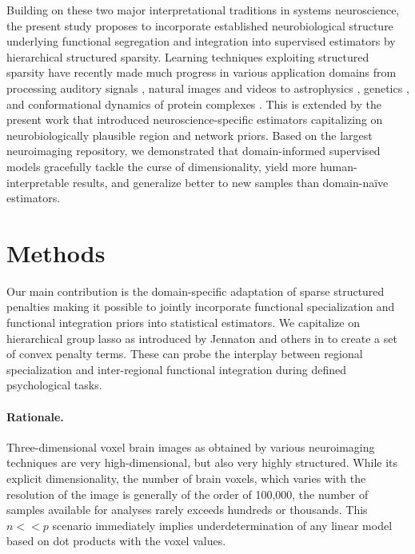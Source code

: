 \documentclass{article} %
\begin{document}
Building on these two major interpretational traditions in systems neuroscience,
the present study proposes to incorporate
established neurobiological structure underlying
functional segregation and integration
into supervised estimators
by hierarchical structured sparsity.
%
Learning techniques
exploiting structured sparsity 
have recently made much progress in various application domains
from processing auditory signals \cite{daudet2004sparse},
natural images \cite{harzallah2009combining} and
videos \cite{kang2015structured, kim2010sparse}
to
astrophysics \cite{vinci2014estimating},
genetics \cite{rapaport2008classification, kim2012tree},
and
conformational dynamics of protein complexes \cite{jenatton2009structured}.
%
This is extended by the present work that
introduced neuroscience-specific estimators capitalizing on
neurobiologically plausible region and network priors.
%
Based on the largest neuroimaging repository,
we demonstrated that domain-informed supervised models
gracefully tackle the curse of dimensionality,
yield more human-interpretable results,
and generalize better to new samples
than domain-na\"ive estimators.



\section{Methods}
Our main contribution is the domain-specific adaptation of sparse structured
penalties making it possible to jointly incorporate functional 
specialization and functional integration priors into statistical 
estimators.
We capitalize on hierarchical group lasso as introduced by Jennaton and 
others in \cite{jenatton2011structured} to create a set of convex penalty terms.
These can probe the interplay between regional specialization and 
inter-regional functional integration during defined psychological tasks.
%
\paragraph{Rationale.}
Three-dimensional voxel brain images as obtained by various neuroimaging
techniques are very high-dimensional, but also very highly structured.
While its explicit dimensionality, the number of brain voxels, which varies with
the resolution of the image is generally of the order of 100,000, the number
of samples available for analyses rarely exceeds hundreds or thousands.
This \(n << p\) scenario immediately implies underdetermination of any
linear model based on dot products with the voxel values.
\end{document}

